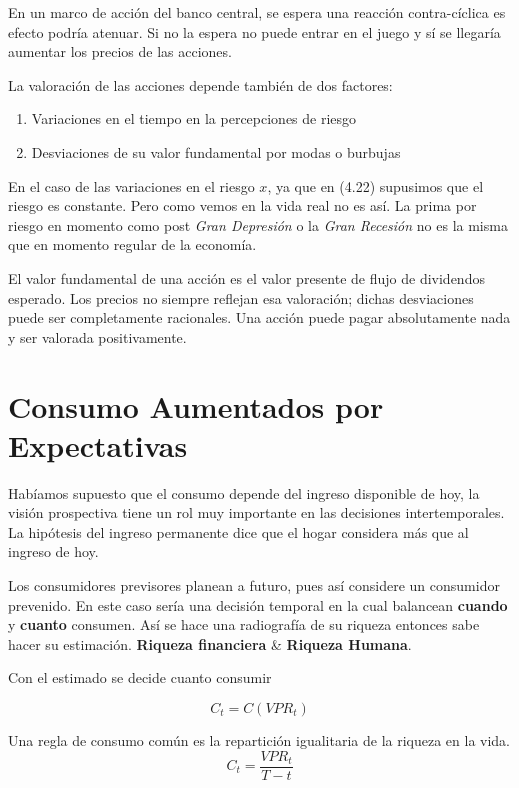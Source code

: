 En un marco de acción del banco central, se espera una reacción contra-cíclica es efecto podría atenuar. Si no la espera no puede entrar en el juego y sí se llegaría aumentar los precios de las acciones. 

La valoración de las acciones depende también de dos factores: 

\begin{enumerate}
    \item Variaciones en el tiempo en la percepciones de riesgo
    \item Desviaciones de su valor fundamental por modas o burbujas
\end{enumerate}

En el caso de las variaciones en el riesgo $x$, ya que en (4.22) supusimos que el riesgo es constante. Pero como vemos en la vida real no es así. La prima por riesgo en momento como post \textit{Gran Depresión} o la \textit{Gran Recesión} no es la misma que en momento regular de la economía. 

El valor fundamental de una acción es el valor presente de flujo de dividendos esperado. Los precios no siempre reflejan esa valoración; dichas desviaciones puede ser completamente racionales. Una acción puede pagar absolutamente nada y ser valorada positivamente. 

\section{Consumo Aumentados por Expectativas}

Habíamos supuesto que el consumo depende del ingreso disponible de hoy, la visión prospectiva tiene un rol muy importante en las decisiones intertemporales. La hipótesis del ingreso permanente dice que el hogar considera más que al ingreso de hoy.  

Los consumidores previsores planean a futuro, pues así considere un consumidor prevenido. En este caso sería una decisión temporal en la cual balancean \textbf{cuando} y \textbf{cuanto} consumen. Así se hace una radiografía de su riqueza entonces sabe hacer su estimación. \textbf{Riqueza financiera} \& \textbf{Riqueza Humana}.

Con el estimado se decide cuanto consumir

\begin{equation}
    C_{t} = C(VPR_{t})
\end{equation}

\begin{remark}
Una regla de consumo común es la repartición igualitaria de la riqueza en la vida.
\begin{equation}
    C_{t} = \frac{VPR_{t}}{T-t}
\end{equation}
\end{remark}

